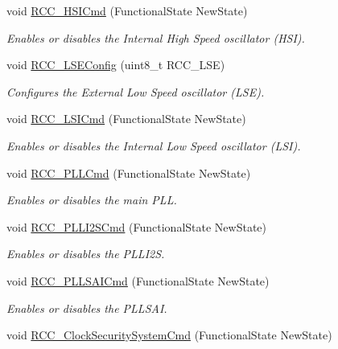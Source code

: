 \begin{DoxyCompactItemize}
void \mbox{\hyperlink{group___r_c_c___group1_ga0c6772a1e43765909495f57815ef69e2}{R\+C\+C\+\_\+\+H\+S\+I\+Cmd}} (Functional\+State New\+State)
\begin{DoxyCompactList}\small\item\em Enables or disables the Internal High Speed oscillator (H\+SI). \end{DoxyCompactList}\item 
void \mbox{\hyperlink{group___r_c_c___group1_ga65209ab5c3589b249c7d70f978735ca6}{R\+C\+C\+\_\+\+L\+S\+E\+Config}} (uint8\+\_\+t R\+C\+C\+\_\+\+L\+SE)
\begin{DoxyCompactList}\small\item\em Configures the External Low Speed oscillator (L\+SE). \end{DoxyCompactList}\item 
void \mbox{\hyperlink{group___r_c_c___group1_ga81e3ca29fd154ac2019bba6936d6d5ed}{R\+C\+C\+\_\+\+L\+S\+I\+Cmd}} (Functional\+State New\+State)
\begin{DoxyCompactList}\small\item\em Enables or disables the Internal Low Speed oscillator (L\+SI). \end{DoxyCompactList}\item 
void \mbox{\hyperlink{group___r_c_c___group1_ga84dee53c75e58fdb53571716593c2272}{R\+C\+C\+\_\+\+P\+L\+L\+Cmd}} (Functional\+State New\+State)
\begin{DoxyCompactList}\small\item\em Enables or disables the main P\+LL. \end{DoxyCompactList}\item 
void \mbox{\hyperlink{group___r_c_c___group1_ga2efe493a6337d5e0034bfcdfb0f541e4}{R\+C\+C\+\_\+\+P\+L\+L\+I2\+S\+Cmd}} (Functional\+State New\+State)
\begin{DoxyCompactList}\small\item\em Enables or disables the P\+L\+L\+I2S. \end{DoxyCompactList}\item 
void \mbox{\hyperlink{group___r_c_c___group1_gaf7b2c8f7533c8321dce97196d9f77fc1}{R\+C\+C\+\_\+\+P\+L\+L\+S\+A\+I\+Cmd}} (Functional\+State New\+State)
\begin{DoxyCompactList}\small\item\em Enables or disables the P\+L\+L\+S\+AI. \end{DoxyCompactList}\item 
void \mbox{\hyperlink{group___r_c_c___group1_ga0ff1fd7b9a8a49cdda11b7d7261c3494}{R\+C\+C\+\_\+\+Clock\+Security\+System\+Cmd}} (Functional\+State New\+State)

\end{DoxyCompactItemize}
